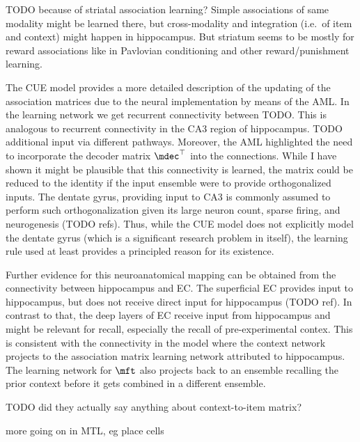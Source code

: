 TODO because of striatal association learning?
Simple associations of same modality might be learned there, but cross-modality and integration (i.e.\ of item and context) might happen in hippocampus.
But striatum seems to be mostly for reward associations like in Pavlovian conditioning and other reward/punishment learning.

The CUE model provides a more detailed description of the updating of the association matrices due to the neural implementation by means of the AML\@.
In the learning network we get recurrent connectivity between TODO\@.
This is analogous to recurrent connectivity in the CA3 region of hippocampus.
TODO additional input via different pathways.
Moreover, the AML highlighted the need to incorporate the decoder matrix $\mdec\Tr$ into the connections.
While I have shown it might be plausible that this connectivity is learned, the matrix could be reduced to the identity if the input ensemble were to provide orthogonalized inputs.
The dentate gyrus, providing input to CA3 is commonly assumed to perform such orthogonalization given its large neuron count, sparse firing, and neurogenesis (TODO refs).
Thus, while the CUE model does not explicitly model the dentate gyrus (which is a significant research problem in itself), the learning rule used at least provides a principled reason for its existence.

Further evidence for this neuroanatomical mapping can be obtained from the connectivity between hippocampus and EC\@.
The superficial EC provides input to hippocampus, but does not receive direct input for hippocampus (TODO ref).
In contrast to that, the deep layers of EC receive input from hippocampus and might be relevant for recall, especially the recall of pre-experimental contex.
This is consistent with the connectivity in the model where the context network projects to the association matrix learning network attributed to hippocampus.
The learning network for $\mft$ also projects back to an ensemble recalling the prior context before it gets combined in a different ensemble.


TODO did they actually say anything about context-to-item matrix?

more going on in MTL, eg place cells
